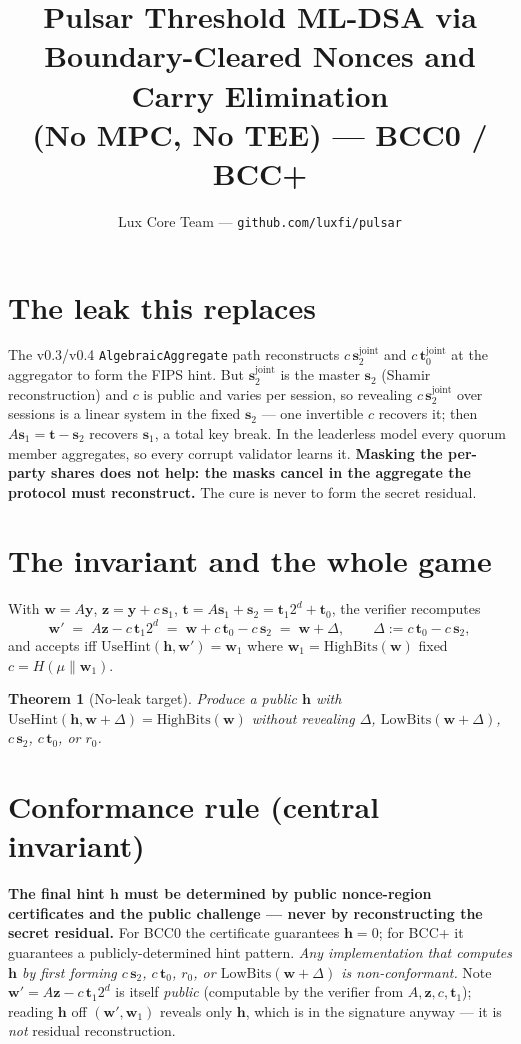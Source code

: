 \documentclass[11pt]{article}
\title{Pulsar Threshold ML-DSA via Boundary-Cleared Nonces and Carry
Elimination\\(No MPC, No TEE) --- BCC0 / BCC+}
\author{Lux Core Team --- \texttt{github.com/luxfi/pulsar}}
\date{}
\newtheorem{theorem}{Theorem}
\theoremstyle{remark}\newtheorem{remark}{Remark}
\begin{document}
\maketitle

\section{The leak this replaces}
The v0.3/v0.4 \texttt{AlgebraicAggregate} path reconstructs $c\,\mathbf
s_2^{\mathrm{joint}}$ and $c\,\mathbf t_0^{\mathrm{joint}}$ at the
aggregator to form the FIPS hint. But $\mathbf s_2^{\mathrm{joint}}$ is
the master $\mathbf s_2$ (Shamir reconstruction) and $c$ is public and
varies per session, so revealing $c\,\mathbf s_2^{\mathrm{joint}}$ over
sessions is a linear system in the fixed $\mathbf s_2$ --- one invertible
$c$ recovers it; then $A\mathbf s_1 = \mathbf t - \mathbf s_2$ recovers
$\mathbf s_1$, a total key break. In the leaderless model every quorum
member aggregates, so every corrupt validator learns it. \textbf{Masking
the per-party shares does not help: the masks cancel in the aggregate the
protocol must reconstruct.} The cure is never to form the secret residual.

\section{The invariant and the whole game}
With $\mathbf w = A\mathbf y$, $\mathbf z = \mathbf y + c\,\mathbf s_1$,
$\mathbf t = A\mathbf s_1 + \mathbf s_2 = \mathbf t_1 2^d + \mathbf t_0$,
the verifier recomputes
\[
  \mathbf w' \;=\; A\mathbf z - c\,\mathbf t_1 2^d
  \;=\; \mathbf w + c\,\mathbf t_0 - c\,\mathbf s_2
  \;=\; \mathbf w + \Delta, \qquad \Delta := c\,\mathbf t_0 - c\,\mathbf
  s_2,
\]
and accepts iff $\mathrm{UseHint}(\mathbf h, \mathbf w') = \mathbf w_1$
where $\mathbf w_1 = \mathrm{HighBits}(\mathbf w)$ fixed $c = H(\mu \| \mathbf
w_1)$.
\begin{theorem}[No-leak target]
Produce a public $\mathbf h$ with $\mathrm{UseHint}(\mathbf h, \mathbf w +
\Delta) = \mathrm{HighBits}(\mathbf w)$ \emph{without} revealing $\Delta$,
$\mathrm{LowBits}(\mathbf w + \Delta)$, $c\,\mathbf s_2$, $c\,\mathbf
t_0$, or $r_0$.
\end{theorem}

\section{Conformance rule (central invariant)}
\label{sec:rule}
\textbf{The final hint $\mathbf h$ must be determined by public
nonce-region certificates and the public challenge --- never by
reconstructing the secret residual.} For BCC0 the certificate guarantees
$\mathbf h = 0$; for BCC+ it guarantees a publicly-determined hint
pattern. \emph{Any implementation that computes $\mathbf h$ by first
forming $c\,\mathbf s_2$, $c\,\mathbf t_0$, $r_0$, or
$\mathrm{LowBits}(\mathbf w + \Delta)$ is non-conformant.} Note $\mathbf
w' = A\mathbf z - c\,\mathbf t_1 2^d$ is itself \emph{public} (computable
by the verifier from $A,\mathbf z,c,\mathbf t_1$); reading $\mathbf h$ off
$(\mathbf w', \mathbf w_1)$ reveals only $\mathbf h$, which is in the
signature anyway --- it is \emph{not} residual reconstruction.
\end{document}
